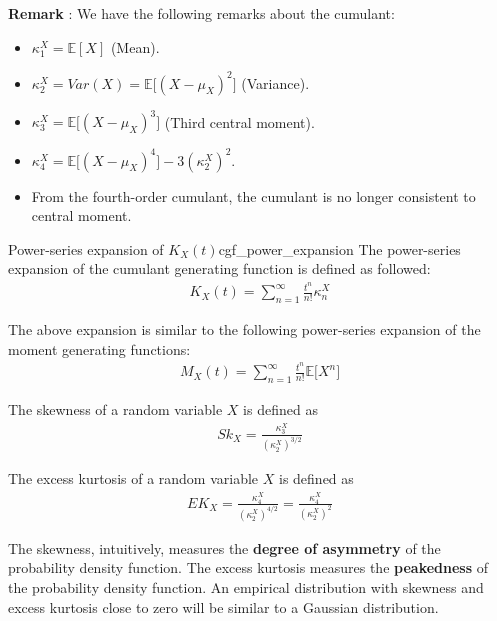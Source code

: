 \textbf{Remark} : We have the following remarks about the cumulant:
\begin{itemize}
    \item $\kappa_1^X=\mathbb{E}[X]$ (Mean).
    \item $\kappa_2^X=Var(X)=\mathbb{E}\Big[ (X - \mu_X)^2 \Big]$ (Variance).
    \item $\kappa_3^X=\mathbb{E}\Big[ (X - \mu_X)^3 \Big]$ (Third central moment).
    \item $\kappa_4^X=\mathbb{E}\Big[ (X - \mu_X)^4 \Big] - 3(\kappa_2^X)^2$.
    \item From the fourth-order cumulant, the cumulant is no longer consistent to central moment.
\end{itemize}

\begin{proposition}{Power-series expansion of $K_X(t)$}{cgf_power_expansion}
    The power-series expansion of the cumulant generating function is defined as followed:
    \begin{align*}
        K_X(t) = \sum_{n=1}^\infty \frac{t^n}{n!}\kappa_n^X
    \end{align*}

    \noindent\newline The above expansion is similar to the following power-series expansion of the moment generating functions:
    \begin{align*}
        M_X(t) = \sum_{n=1}^\infty \frac{t^n}{n!}\mathbb{E}\Big[X^n\Big]
    \end{align*}
\end{proposition}

\begin{definition}
    The skewness of a random variable $X$ is defined as
    \begin{align*}
        Sk_X = \frac{\kappa_3^X}{(\kappa_2^X)^{3/2}}
    \end{align*}

    The excess kurtosis of a random variable $X$ is defined as
    \begin{align*}
        EK_X = \frac{\kappa_4^X}{(\kappa_2^X)^{4/2}} = \frac{\kappa_4^X}{(\kappa_2^X)^{2}}
    \end{align*}
\end{definition}

\noindent \newline The skewness, intuitively, measures the \textbf{degree of asymmetry} of the probability density function. The excess kurtosis measures the \textbf{peakedness} of the probability density function. An empirical distribution with skewness and excess kurtosis close to zero will be similar to a Gaussian distribution.

